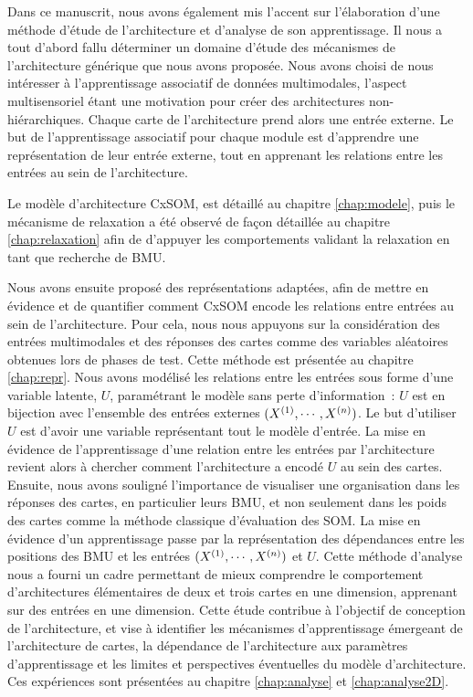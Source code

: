 Dans ce manuscrit, nous avons également mis l'accent sur l'élaboration d'une méthode d'étude de l'architecture et d'analyse de son apprentissage. 
Il nous a tout d'abord fallu déterminer un domaine d'étude des mécanismes de l'architecture générique que nous avons proposée. Nous avons choisi de nous intéresser à l'apprentissage associatif de données multimodales, l'aspect multisensoriel étant une motivation pour créer des architectures non-hiérarchiques. Chaque carte de l'architecture prend alors une entrée externe.
Le but de l'apprentissage associatif pour chaque module est d'apprendre une représentation de leur entrée externe, tout en apprenant les relations entre les entrées au sein de l'architecture.


Le modèle d'architecture CxSOM, est détaillé au chapitre \ref{chap:modele}, puis le mécanisme de relaxation a été observé de façon détaillée au chapitre \ref{chap:relaxation} afin de d'appuyer les comportements validant la relaxation en tant que recherche de BMU. 

Nous avons ensuite proposé des représentations adaptées, afin de mettre en évidence et de quantifier comment CxSOM encode les relations entre entrées au sein de l'architecture. Pour cela, nous nous appuyons sur la considération des entrées multimodales et des réponses des cartes comme des variables aléatoires obtenues lors de phases de test. Cette méthode est présentée au chapitre \ref{chap:repr}.
Nous avons modélisé les relations entre les entrées sous forme d'une variable latente, $U$, paramétrant le modèle sans perte d'information~: $U$ est en bijection avec l'ensemble des entrées externes $(X^{({1})}, \cdots, X^{({n})})$. Le but d'utiliser $U$ est d'avoir une variable représentant tout le modèle d'entrée.
La mise en évidence de l'apprentissage d'une relation entre les entrées par l'architecture revient alors à chercher comment l'architecture a encodé $U$ au sein des cartes.
Ensuite, nous avons souligné l'importance de visualiser une organisation dans les réponses des cartes, en particulier leurs BMU, et non seulement dans les poids des cartes comme la méthode classique d'évaluation des SOM. La mise en évidence d'un apprentissage passe par la représentation des dépendances entre les positions des BMU et les entrées $(X^{({1})}, \cdots, X^{({n})})$ et $U$.
Cette méthode d'analyse nous a fourni un cadre permettant de mieux comprendre le comportement d'architectures élémentaires de deux et trois cartes en une dimension, apprenant sur des entrées en une dimension. Cette étude contribue à l'objectif de conception de l'architecture, et vise à identifier les mécanismes d'apprentissage émergeant de l'architecture de cartes, la dépendance de l'architecture aux paramètres d'apprentissage et les limites et perspectives éventuelles du modèle d'architecture.
Ces expériences sont présentées au chapitre \ref{chap:analyse} et \ref{chap:analyse2D}.


